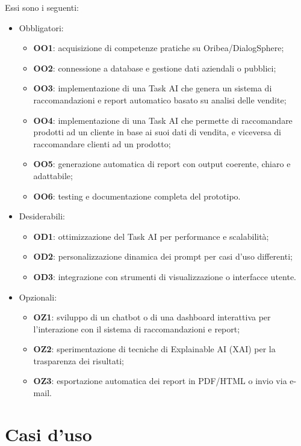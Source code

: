 Essi sono i seguenti:
\begin{itemize}
    \item Obbligatori:
    \begin{itemize}
        \item \textbf{OO1}: acquisizione di competenze pratiche su Oribea/DialogSphere;
        \item \textbf{OO2}: connessione a database e gestione dati aziendali o pubblici;
        \item \textbf{OO3}: implementazione di una Task AI che genera un sistema di raccomandazioni e report automatico basato su analisi delle vendite;
        \item \textbf{OO4}: implementazione di una Task AI che permette di raccomandare prodotti ad un cliente in base ai suoi dati di vendita, e viceversa di raccomandare clienti ad un prodotto;
        \item \textbf{OO5}: generazione automatica di report con output coerente, chiaro e adattabile;
        \item \textbf{OO6}: testing e documentazione completa del prototipo.
    \end{itemize}
    \item Desiderabili:
    \begin{itemize}
        \item \textbf{OD1}: ottimizzazione del Task AI per performance e scalabilità;
        \item \textbf{OD2}: personalizzazione dinamica dei prompt per casi d’uso differenti;
        \item \textbf{OD3}: integrazione con strumenti di visualizzazione o interfacce utente.
    \end{itemize}
    \item Opzionali:
    \begin{itemize}
        \item \textbf{OZ1}: sviluppo di un chatbot o di una dashboard interattiva per l'interazione con il sistema di raccomandazioni e report;
        \item \textbf{OZ2}: sperimentazione di tecniche di Explainable AI (XAI) per la trasparenza dei risultati;
        \item \textbf{OZ3}: esportazione automatica dei report in PDF/HTML o invio via e-mail.
    \end{itemize}
\end{itemize}


\newpage

\section{Casi d'uso}

